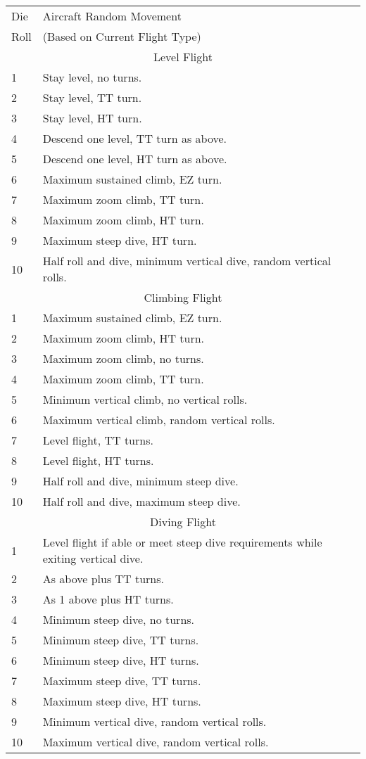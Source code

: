 \begin{TABLE}


\small
\begin{tabularx}{\linewidth}{lX}
\hline
Die&Aircraft Random Movement\\
Roll&(Based on Current Flight Type)\\
\hline
\multicolumn{2}{c}{Level Flight}\\
\hline
1   &Stay level, no turns.\\
2   &Stay level, TT turn.\\
3   &Stay level, HT turn.\\
4   &Descend one level, TT turn as above.\\
5   &Descend one level, HT turn as above.\\
6   &Maximum sustained climb, EZ turn.\\
7   &Maximum zoom climb, TT turn.\\
8   &Maximum zoom climb, HT turn.\\
9   &Maximum steep dive, HT turn.\\
10  &Half roll and dive, minimum vertical dive, random vertical rolls.\\
\hline
\multicolumn{2}{c}{Climbing Flight}\\
\hline
1   &Maximum sustained climb, EZ turn.\\
2   &Maximum zoom climb, HT turn.\\
3   &Maximum zoom climb, no turns.\\
4   &Maximum zoom climb, TT turn.\\
5   &Minimum vertical climb, no vertical rolls.\\
6   &Maximum vertical climb, random vertical rolls.\\
7   &Level flight, TT turns.\\
8   &Level flight, HT turns.\\
9   &Half roll and dive, minimum steep dive.\\
10  &Half roll and dive, maximum steep dive.\\
\hline
\multicolumn{2}{c}{Diving Flight}\\
\hline
1   &Level flight if able or meet steep dive requirements while exiting vertical dive.\\
2   &As above plus TT turns.\\
3   &As 1 above plus HT turns.\\
4   &Minimum steep dive, no turns.\\
5   &Minimum steep dive, TT turns.\\
6   &Minimum steep dive, HT turns.\\
7   &Maximum steep dive, TT turns.\\
8   &Maximum steep dive, HT turns.\\
9   &Minimum vertical dive, random vertical rolls.\\
10  &Maximum vertical dive, random vertical rolls.\\
\hline
\end{tabularx}


\end{TABLE}
